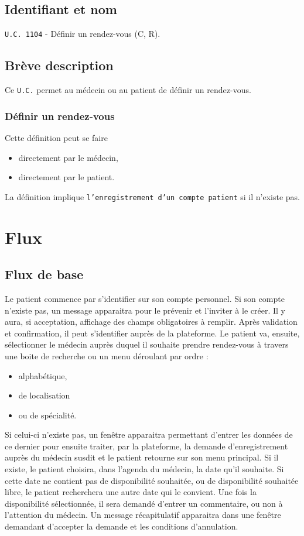 \subsection{Identifiant et nom}
\texttt{U.C. 1104} - Définir un rendez-vous (C, R).
\subsection{Brève description}
Ce \texttt{U.C.} permet au médecin ou au patient de définir un rendez-vous.
\subsubsection{Définir un rendez-vous}
Cette définition peut se faire
\begin{itemize}
	\item directement par le médecin,
	\item directement par le patient.
\end{itemize}

La définition implique \texttt{l'enregistrement d'un compte patient} si il n'existe pas.
\newpage

\section{Flux}
\subsection{Flux de base}
Le patient commence par s'identifier sur son compte personnel. 
Si son compte n'existe pas, un message apparaitra pour le prévenir et l'inviter
à le créer. Il y aura, si acceptation, affichage des champs obligatoires à
remplir. Après validation et confirmation, il peut s'identifier auprès de la plateforme.
Le patient va, ensuite, sélectionner le médecin auprès duquel il souhaite
prendre rendez-vous à travers une boite de recherche ou un menu déroulant par
ordre :
\begin{itemize}
	\item alphabétique,
	\item de localisation
	\item ou de spécialité.
\end{itemize}

Si celui-ci n'existe pas, un fenêtre apparaitra permettant d'entrer les données 
de ce dernier pour ensuite traiter, par la plateforme, la
demande d'enregistrement auprès du médecin susdit et le patient retourne sur
son menu principal.
Si il existe, le patient choisira, dans l'agenda du médecin, la date qu'il
souhaite. Si cette date ne contient pas de disponibilité souhaitée, ou de
disponibilité souhaitée libre, le patient recherchera une autre date qui le 
convient.
Une fois la disponibilité sélectionnée, il sera demandé d'entrer un commentaire,
ou non à l'attention du médecin. Un message récapitulatif apparaitra dans une
fenêtre demandant d'accepter la demande et les conditions d'annulation.

